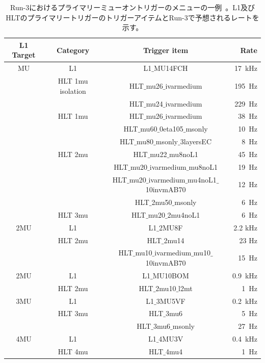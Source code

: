 \begin{table}[]
    \caption{Run-3におけるプライマリーミューオントリガーのメニューの一例~\cite{article:Run3trigmenu}。L1及びHLTのプライマリートリガーのトリガーアイテムとRun-3で予想されるレートを示す。}
    \label{triigermenu}
    \centering
    \begin{tabular}{|c|c|c|r|}
    \hline
        L1 Target & Category & Trigger item & Rate\\
        \hline
        MU  & L1 & L1$\_$MU14FCH & 17~kHz\\
        \hline
            &HLT 1mu isolation & HLT$\_$mu26$\_$ivarmedium& 195~Hz\\
            &        & HLT$\_$mu24$\_$ivarmedium & 229~Hz\\
        \hline
            &HLT 1mu& HLT$\_$mu26$\_$ivarmedium & 38~Hz\\
            &       & HLT$\_$mu60$\_$0eta105$\_$msonly & 10~Hz\\
            &       & HLT$\_$mu80$\_$msonly$\_$3layersEC & 8~Hz\\
        \hline
            &HLT 2mu & HLT$\_$mu22$\_$mu8noL1 & 45~Hz\\
            &       & HLT$\_$mu20$\_$ivarmedium$\_$mu8noL1 & 19~Hz\\
            &       & HLT$\_$mu20$\_$ivarmedium$\_$mu4noL1$\_$10invmAB70 & 12~Hz\\
            &       & HLT$\_$2mu50$\_$msonly & 6~Hz\\
        \hline
            &HLT 3mu    & HLT$\_$mu20$\_$2mu4noL1 & 6~Hz\\
        \hline
        \hline
        2MU & L1        & L1$\_$2MU8F & 2.2 kHz\\
        \hline
            & HLT 2mu   & HLT$\_$2mu14 & 23 Hz\\
            &           & HLT$\_$mu10$\_$ivarmedium$\_$mu10$\_$10invmAB70 & 15~Hz\\
        \hline
        \hline
        2MU & L1 & L1$\_$MU10BOM & 0.9~kHz\\
        \hline
            & HLT 2mu & HLT$\_$2mu10$\_$l2mt & 1~Hz\\
        \hline
        \hline
        3MU &L1 & L1$\_$3MU5VF & 0.2~kHz\\
        \hline
            &HLT 3mu & HLT$\_$3mu6 & 5~Hz\\
            &        &HLT$\_$3mu6$\_$msonly &27~Hz\\
        \hline
        \hline
        4MU & L1 & L1$\_$4MU3V & 0.4~kHz\\
        \hline
            & HLT 4mu & HLT$\_$4mu4 & 1~Hz\\
        \hline
    \end{tabular}
\end{table}



